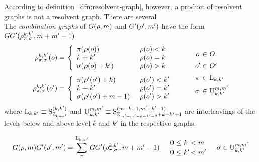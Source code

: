 \documentclass[11pt]{article}
\numberwithin{equation}{section}
\begin{document}
\begin{dfn}
According to definition~\ref{dfn:resolvent-graph}, however, a product of resolvent graphs is not a resolvent graph.
There are several \ld\\
The \textit{combination graphs} of $G(\rho ,m)$ and $G'(\rho ',m')$ have the form
$GG'(\rh_{\pi,\si}^{k,k'},m+m'-1)$\\
\begin{align*}
\begin{array}{r@{\ }l}
  \rh_{\pi,\si}^{k,k'}(o)
=&
\left\{
\begin{array}{ll}
  \pi(\rh(o))      & \rh(o)<k \\
  k + k'           & \rh(o)=k \\
  \makebox[2.8cm][l]{$\si(\rh(o) + k')$} & \rh(o)>k \\
\end{array}
\right.
\\[20pt]
  \rh_{\pi,\si}^{k,k'}(o')
=&
\left\{
\begin{array}{ll}
  \pi(\rh'(o') + k)   & \rh(o')<k' \\
  k + k'              & \rh(o')=k' \\
  \makebox[2.8cm][l]{$\si(\rh'(o') + m-1)$} & \rh(o')>k' \\
\end{array}
\right.
\end{array}
\hspace{20pt}
\begin{array}{r@{\ }l}
  o\,
\in&
  O
\\[5pt]
  o'
\in&
  O'
\\[5pt]
  \pi\,
\in&
  \mr{L}_{k,k'}
\\[5pt]
  \si\,
\in&
  \mr{U}_{k,k'}^{m,m'}
\end{array}
\end{align*}
where
$
  \mathrm{L}_{k,k'}
\equiv
  \mathrm{S}^{(k,k')}_{\mathbb{Z}_{k+k'}}
$
and
$
  \mathrm{U}_{k,k'}^{m,m'}
\equiv
  \mathrm{S}^{(m-k-1,m'-k'-1)}_{\mathbb{Z}_{m'+m'-k-k'-2} + k + k' + 1}
$
are interleavings of the levels below and above level $k$ and $k'$ in the respective graphs.
\end{dfn}

\begin{thm}
\begin{align}
  G(\rh,m)
  G'(\rh',m')
=
  \sum_\pi^{\mr{L}_{k,k'}}
  GG'(\rh_{\pi,\si}^{k,k'},m+m'-1)
&&
\begin{array}{r@{\ }l@{\,}l}
  0\leq& k &<m \\[2pt]
  0\leq& k'&<m'
\end{array}
\hspace{10pt}
  \si\in\mr{U}_{k,k'}^{m,m'}
\end{align}
\end{thm}
\end{document}
